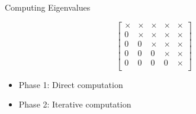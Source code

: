 \documentclass{beamer}
\begin{document}
\begin{frame}{Computing Eigenvalues}
\begin{footnotesize}
\begin{equation*}
\begin{bmatrix}
\times & \times & \times & \times & \times \\
0 & \times & \times & \times & \times \\
0 & 0 & \times & \times & \times \\
0 & 0 & 0 & \times & \times \\
0 & 0 & 0 & 0 & \times \\
\end{bmatrix}
\end{equation*}
\end{footnotesize}
\begin{itemize}
    \item[] Phase 1: Direct computation
    \item[] Phase 2: Iterative computation
\end{itemize}

\end{frame}
\end{document}
